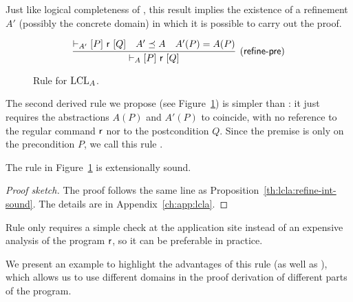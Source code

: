 Just like logical completeness of , this result implies the existence of a refinement $A'$ (possibly the concrete domain) in which it is possible to carry out the proof.

\begin{figure*}[t]
	\begin{framed}
		\[
		\infer[\lclrule{refine\mbox{-}pre}]
		{\lcl{A}{P}{\regr}{Q}}
		{\lcl{A'}{P}{\regr}{Q} \quad A' \preceq A \quad A'(P) = A(P) }
		\]
	\end{framed}
	\vspace{-1ex}
	\caption{Rule  for $\text{LCL}_A$.}\label{fig:lcla:rule-refine-pre}
\end{figure*}

The second derived rule we propose (see Figure~\ref{fig:lcla:rule-refine-pre}) is simpler than : it just requires the abstractions $A(P)$ and $A'(P)$ to coincide, with no reference to the regular command $\mathsf{r}$ nor to the postcondition $Q$. Since the premise is only on the precondition $P$, we call this rule .

\begin{prop}\label{th:lcla:refine-pre-sound}
	The rule  in Figure~\ref{fig:lcla:rule-refine-pre} is extensionally sound.
\end{prop}
\begin{proof}[Proof sketch]
	The proof follows the same line as Proposition~\ref{th:lcla:refine-int-sound}. The details are in Appendix~\ref{ch:app:lcla}.
\end{proof}

Rule  only requires a simple check at the application site instead of an expensive analysis of the program $\mathsf{r}$, so it can be preferable in practice.

We present an example to highlight the advantages of this rule (as well as ), which allows us to use different domains in the proof derivation of different parts of the program.

